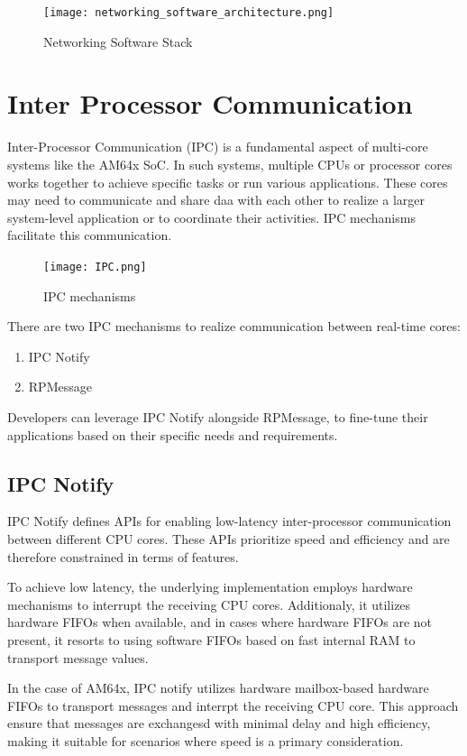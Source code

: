 \begin{figure}[H]
    \centering
    \texttt{[image: networking\_software\_architecture.png]}
    \caption{Networking Software Stack}
\end{figure}

\section{Inter Processor Communication}

Inter-Processor Communication (IPC) is a fundamental aspect of multi-core
systems like the AM64x SoC. In such systems, multiple CPUs or processor cores
works together to achieve specific tasks or run various applications.
These cores may need to communicate and share daa with each other to realize a
larger system-level application or to coordinate their activities.
IPC mechanisms facilitate this communication.

\begin{figure}[H]
    \centering
    \texttt{[image: IPC.png]}
    \caption{IPC mechanisms}
\end{figure}

There are two IPC mechanisms to realize communication between real-time cores:

\begin{enumerate}
    \item   IPC Notify
    \item   RPMessage
\end{enumerate}

Developers can leverage IPC Notify alongside RPMessage, to fine-tune their
applications based on their specific needs and requirements.

\subsection{IPC Notify}

IPC Notify defines APIs for enabling low-latency inter-processor communication
between different CPU cores. These APIs prioritize speed and efficiency and are
therefore constrained in terms of features.

To achieve low latency, the underlying implementation employs hardware
mechanisms to interrupt the receiving CPU cores. Additionaly, it utilizes
hardware FIFOs when available, and in cases where hardware FIFOs are not
present, it resorts to using software FIFOs based on fast internal RAM to
transport message values.

In the case of AM64x, IPC notify utilizes hardware mailbox-based hardware FIFOs
to transport messages and interrpt the receiving CPU core.
This approach ensure that messages are exchangesd with minimal delay and high
efficiency, making it suitable for scenarios where speed is a primary
consideration.

